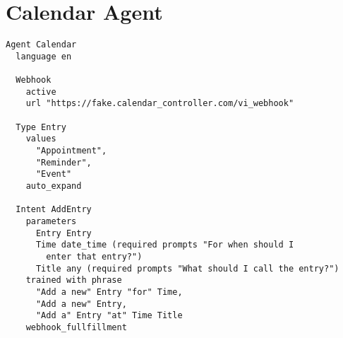 \section{Calendar Agent}
\label{Calendar Agent DSL}

\begin{lstlisting}
Agent Calendar
  language en

  Webhook
    active
    url "https://fake.calendar_controller.com/vi_webhook"
  
  Type Entry
    values 
      "Appointment", 
      "Reminder", 
      "Event"
    auto_expand
  
  Intent AddEntry
    parameters 
      Entry Entry
      Time date_time (required prompts "For when should I
        enter that entry?")
      Title any (required prompts "What should I call the entry?")
    trained with phrase
      "Add a new" Entry "for" Time,
      "Add a new" Entry,
      "Add a" Entry "at" Time Title
    webhook_fullfillment
\end{lstlisting}